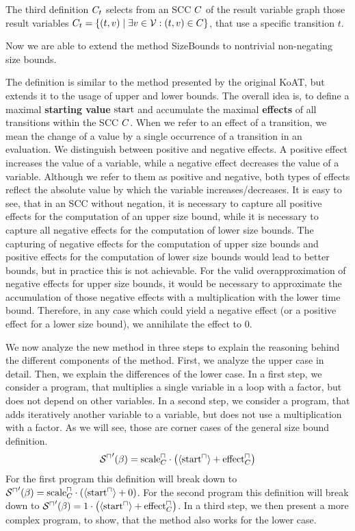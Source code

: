 The third definition $C_t$ selects from an SCC $C$ of the result variable graph those result variables $C_t = \lbrace (t,v) \mid \exists v \in \mathcal{V} : (t,v) \in C \rbrace$, that use a specific transition $t$.


Now we are able to extend the method SizeBounds to nontrivial non-negating size bounds.



The definition is similar to the method presented by the original KoAT, but extends it to the usage of upper and lower bounds.
The overall idea is, to define a maximal \textbf{starting value} $\text{start}$ and accumulate the maximal \textbf{effects} of all transitions within the SCC $C$.
When we refer to an effect of a transition, we mean the change of a value by a single occurrence of a transition in an evaluation.
We distinguish between positive and negative effects.
A positive effect increases the value of a variable, while a negative effect decreases the value of a variable.
Although we refer to them as positive and negative, both types of effects reflect the absolute value by which the variable increases/decreases.
It is easy to see, that in an SCC without negation, it is necessary to capture all positive effects for the computation of an upper size bound, while it is necessary to capture all negative effects for the computation of lower size bounds.
The capturing of negative effects for the computation of upper size bounds and positive effects for the computation of lower size bounds would lead to better bounds, but in practice this is not achievable.
For the valid overapproximation of negative effects for upper size bounds, it would be necessary to approximate the accumulation of those negative effects with a multiplication with the lower time bound.
Therefore, in any case which could yield a negative effect (or a positive effect for a lower size bound), we annihilate the effect to $0$.

We now analyze the new method in three steps to explain the reasoning behind the different components of the method.
First, we analyze the upper case in detail.
Then, we explain the differences of the lower case.
In a first step, we consider a program, that multiplies a single variable in a loop with a factor, but does not depend on other variables.
In a second step, we consider a program, that adds iteratively another variable to a variable, but does not use a multiplication with a factor.
As we will see, those are corner cases of the general size bound definition.
\[ {\mathcal{S}^\sqcap}'(\beta) = \text{scale}^\sqcap_C \cdot \left( \langle\text{start}^\sqcap\rangle + \text{effect}^\sqcap_C \right) \]
For the first program this definition will break down to ${\mathcal{S}^\sqcap}'(\beta) = \text{scale}^\sqcap_C \cdot \left( \langle\text{start}^\sqcap\rangle + 0 \right)$.
For the second program this definition will break down to ${\mathcal{S}^\sqcap}'(\beta) = 1 \cdot \left( \langle\text{start}^\sqcap\rangle + \text{effect}^\sqcap_C \right)$.
In a third step, we then present a more complex program, to show, that the method also works for the lower case.

